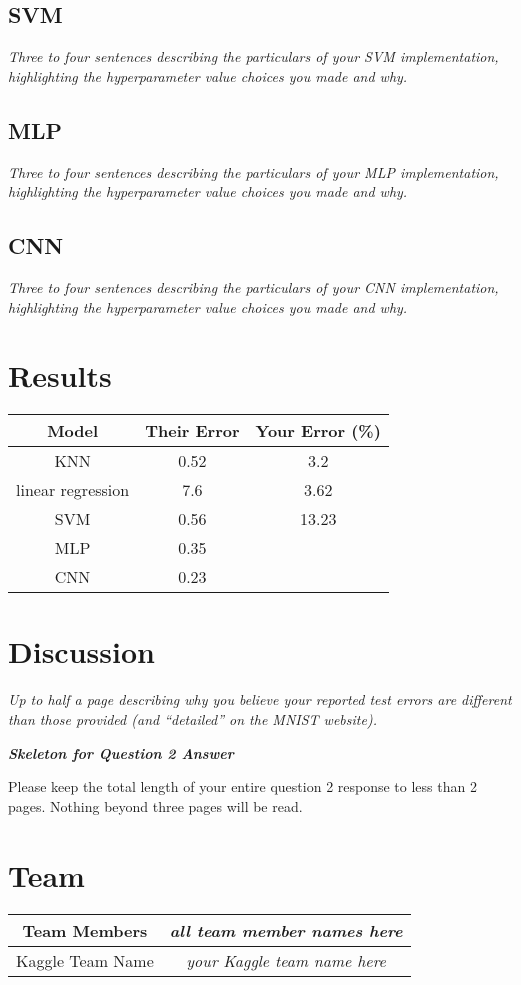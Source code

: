 \documentclass{article}
\begin{document}
\subsection{SVM}
\emph{Three to four sentences describing the particulars of your SVM implementation, highlighting the hyperparameter value choices you made and why.}
\subsection{MLP}
\emph{Three to four sentences describing the particulars of your MLP implementation, highlighting the hyperparameter value choices you made and why.}
\subsection{CNN}
\emph{Three to four sentences describing the particulars of your CNN implementation, highlighting the hyperparameter value choices you made and why.}

\section{Results}
\begin{center}
 \begin{tabular}{|c | c | c|} 
 \hline
 Model & Their Error & Your Error (\%) \\ [0.5ex]
 \hline\hline
 KNN & 0.52 & 3.2 \\
 linear regression & 7.6 & 3.62 \\
 SVM & 0.56 & 13.23 \\
 MLP & 0.35 & \\
 CNN & 0.23 & \\ 
 \hline
\end{tabular}
\end{center}

\section{Discussion}
\emph{Up to half a page describing why you believe your reported test errors are different than those provided (and ``detailed'' on the MNIST website).}

\newpage

{\em \bf Skeleton for Question 2 Answer}
\setcounter{section}{0}

Please keep the total length of your entire question 2 response to less than 2 pages.  Nothing beyond three pages will be read. 
\section{Team}
\begin{tabular}{|c | c } 
\hline
Team Members & \emph{all team member names here} \\
\hline
Kaggle Team Name & \emph{your Kaggle team name here}\\
\hline
\end{tabular}
\end{document}
